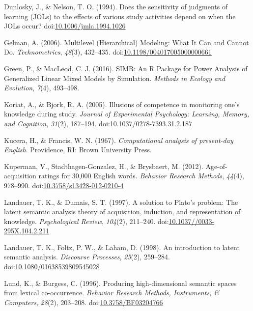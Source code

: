 \documentclass[english,man]{apa6}
\theoremstyle{definition}
\theoremstyle{definition}
\theoremstyle{definition}
\theoremstyle{remark}
\begin{document}
\hypertarget{ref-Dunlosky1994a}{}
Dunlosky, J., \& Nelson, T. O. (1994). Does the sensitivity of judgments
of learning (JOLs) to the effects of various study activities depend on
when the JOLs occur?
doi:\href{https://doi.org/10.1006/jmla.1994.1026}{10.1006/jmla.1994.1026}

\hypertarget{ref-Gelman2006}{}
Gelman, A. (2006). Multilevel (Hierarchical) Modeling: What It Can and
Cannot Do. \emph{Technometrics}, \emph{48}(3), 432--435.
doi:\href{https://doi.org/10.1198/004017005000000661}{10.1198/004017005000000661}

\hypertarget{ref-Green2016}{}
Green, P., \& MacLeod, C. J. (2016). SIMR: An R Package for Power
Analysis of Generalized Linear Mixed Models by Simulation. \emph{Methods
in Ecology and Evolution}, \emph{7}(4), 493--498.

\hypertarget{ref-Koriat2005}{}
Koriat, A., \& Bjork, R. A. (2005). Illusions of competence in
monitoring one's knowledge during study. \emph{Journal of Experimental
Psychology: Learning, Memory, and Cognition}, \emph{31}(2), 187--194.
doi:\href{https://doi.org/10.1037/0278-7393.31.2.187}{10.1037/0278-7393.31.2.187}

\hypertarget{ref-Kucera1967}{}
Kucera, H., \& Francis, W. N. (1967). \emph{Computational analysis of
present-day English}. Providence, RI: Brown University Press.

\hypertarget{ref-Kuperman2012}{}
Kuperman, V., Stadthagen-Gonzalez, H., \& Brysbaert, M. (2012).
Age-of-acquisition ratings for 30,000 English words. \emph{Behavior
Research Methods}, \emph{44}(4), 978--990.
doi:\href{https://doi.org/10.3758/s13428-012-0210-4}{10.3758/s13428-012-0210-4}

\hypertarget{ref-Landauer1997}{}
Landauer, T. K., \& Dumais, S. T. (1997). A solution to Plato's problem:
The latent semantic analysis theory of acquisition, induction, and
representation of knowledge. \emph{Psychological Review}, \emph{104}(2),
211--240.
doi:\href{https://doi.org/10.1037//0033-295X.104.2.211}{10.1037//0033-295X.104.2.211}

\hypertarget{ref-Landauer1998}{}
Landauer, T. K., Foltz, P. W., \& Laham, D. (1998). An introduction to
latent semantic analysis. \emph{Discourse Processes}, \emph{25}(2),
259--284.
doi:\href{https://doi.org/10.1080/01638539809545028}{10.1080/01638539809545028}

\hypertarget{ref-Lund1996}{}
Lund, K., \& Burgess, C. (1996). Producing high-dimensional semantic
spaces from lexical co-occurrence. \emph{Behavior Research Methods,
Instruments, \& Computers}, \emph{28}(2), 203--208.
doi:\href{https://doi.org/10.3758/BF03204766}{10.3758/BF03204766}
\end{document}
